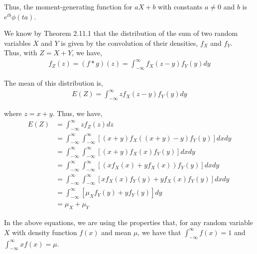 \documentclass[12pt]{article}
\newenvironment{problem}[2][Problem]{\begin{trivlist}
\item[\hskip \labelsep {\bfseries #1}\hskip \labelsep {\bfseries #2.}]}{\end{trivlist}}
\begin{document}
Thus, the moment-generating function for $aX + b$ with constants $a \neq 0$ and $b$ is $e^{tb}\phi(ta)$.

\begin{problem}{6}
\end{problem}

We know by Theorem 2.11.1 that the distribution of the sum of two random variables $X$ and $Y$ is given by the convolution of their densities, $f_X$ and $f_Y$.\\

Thus, with $Z = X + Y$, we have,
\begin{align*}
f_Z(z) = (f*g)(z) = \int_{-\infty}^{\infty} f_X(z-y)f_Y(y) dy
\end{align*}

The mean of this distribution is,
\begin{align*}
E(Z) = \int_{-\infty}^{\infty} zf_X(z-y)f_Y(y) dy
\end{align*}

where $z = x+y$. Thus, we have,
\begin{align*}
E(Z) &= \int_{-\infty}^{\infty} zf_Z(z) dz\\
&= \int_{-\infty}^{\infty} \int_{-\infty}^{\infty} \left[(x+y)f_X((x+y)-y)f_Y(y)\right] dxdy\\
&= \int_{-\infty}^{\infty} \int_{-\infty}^{\infty} \left[(x+y)f_X(x)f_Y(y)\right] dxdy\\
&= \int_{-\infty}^{\infty} \int_{-\infty}^{\infty} \left[(xf_X(x) + yf_X(x))f_Y(y)\right] dxdy\\
&= \int_{-\infty}^{\infty} \int_{-\infty}^{\infty} \left[xf_X(x)f_Y(y) + yf_X(x)f_Y(y)\right] dxdy\\
&= \int_{-\infty}^{\infty} \left[\mu_Xf_Y(y) + yf_Y(y)\right]dy\\
&= \mu_X + \mu_Y
\end{align*}

In the above equations, we are using the properties that, for any random variable $X$ with density function $f(x)$ and mean $\mu$, we have that $\int_{-\infty}^{\infty} f(x) = 1$ and  $\int_{-\infty}^{\infty} xf(x) = \mu$.\\
\end{document}
